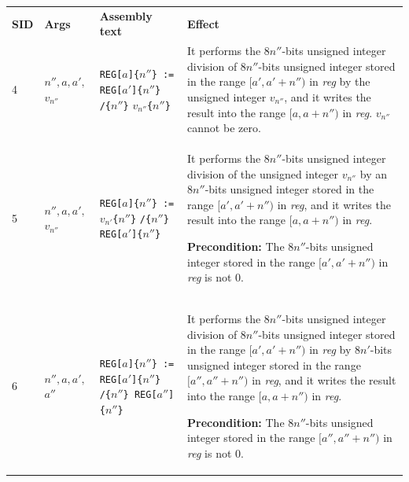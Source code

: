 \documentclass[10pt,twocolumn]{article}
\begin{document}
\clearpage

\begin{table}[!h]
\begin{center}
\def\arraystretch{1.5}
\begin{tabular}{lp{1.2cm}p{5.5cm}p{7.5cm}}
\textbf{SID} & \textbf{Args} & \textbf{Assembly text} & \textbf{Effect}
\\

4 & $ n'',a,a', $ \newline $ v_{n''} $ %
& \texttt{REG[}$ a $\texttt{]\{}$ n'' $\texttt{\} := REG[}$ a' $\texttt{]\{}$
n'' $\texttt{\} /\{}$ n'' $\texttt{\}} $ v_{n''} $\texttt{\{}$ n''
$\texttt{\}} %
& It performs the $ 8n'' $-bits unsigned integer division of $ 8n'' $-bits
unsigned integer stored in the range $ [a',a'+n'') $ in \textit{reg} by the
unsigned integer $ v_{n''} $, and it writes the result into the range $ [a,a+n'')
$ in \textit{reg}. $ v_{n''} $ cannot be zero. \\

5 & $ n'',a,a', $ \newline $ v_{n''} $ %
& \texttt{REG[}$ a $\texttt{]\{}$ n'' $\texttt{\} := } $ v_{n'} $\texttt{\{}$
n'' $\texttt{\}} \texttt{/\{}$ n'' $\texttt{\} REG[}$ a' $\texttt{]\{}$ n''
$\texttt{\}} %
& It performs the $ 8n'' $-bits unsigned integer division of the unsigned
integer  $ v_{n''} $ by an $ 8n'' $-bits unsigned integer stored in the range $
[a',a'+n'') $ in \textit{reg}, and it writes the result into the range $
[a,a+n'') $ in \textit{reg}.

\textbf{Precondition:} The $ 8n'' $-bits unsigned integer stored in the range $
[a',a'+n'') $ in \textit{reg} is not 0. \\

6 & $ n'',a,a',$ \newline $ a'' $ %
& \texttt{REG[}$ a $\texttt{]\{}$ n'' $\texttt{\} := REG[}$ a' $\texttt{]\{}$
n'' $\texttt{\} /\{}$ n'' $\texttt{\} REG[}$ a'' $\texttt{]\{}$ n''
$\texttt{\}} %
& It performs the $ 8n'' $-bits unsigned integer division of $ 8n'' $-bits
unsigned integer stored in the range $ [a',a'+n'') $ in \textit{reg} by $ 8n'
$-bits unsigned integer stored in the range $ [a'',a''+n'') $ in \textit{reg},
and it writes the result into the range $ [a,a+n'') $ in \textit{reg}.

\textbf{Precondition:} The $ 8n'' $-bits unsigned integer stored in the range $
[a'',a''+n'') $ in \textit{reg} is not 0. \\


\end{tabular}
\end{center}
\end{table}
\end{document}
